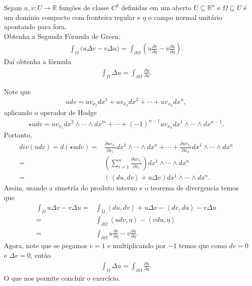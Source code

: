 \begin{homeworkProblem}[Seção 2-15]
  Sejam $u,v:U\to\mathbb{R}$ funções de classe $C^{2}$ definidas em um aberto $U\subseteq \mathbb{R}^{n}$ e $\Omega\subseteq U$ é um domínio compacto com fronteira regular e $\eta$ o campo normal unitário apontando para fora.\\
  Obtenha a Segunda Fórmula de Green:
  \begin{align*}
    \int_{\Omega}\bigl(u\Delta v-v\Delta u\bigr)=\int_{\partial\Omega}\left(u\frac{\partial v}{\partial\eta}-v\frac{\partial u}{\partial\eta}\right).
  \end{align*}
  Daí obtenha a fórmula
  \begin{align*}
    \int_{\Omega}\Delta u=\int_{\partial\Omega}\frac{\partial u}{\partial\eta}.
  \end{align*}
  \begin{solution}
    Note que
    \begin{align*}
      udv=uv_{x_1}dx^{1}+uv_{x_2}dx^{2}+\cdots+uv_{x_n}dx^{n},
    \end{align*}
    aplicando o operador de Hodge
    \begin{align*}
      \star udv=uv_{x_1}dx^{2}\wedge\cdots\wedge dx^{m}+\cdots+(-1)^{n-1}uv_{x_n}dx^{1}\wedge\cdots\wedge dx^{n-1}.
    \end{align*}
    Portanto,
    \begin{align*}
      div(udv)=d(\star udv)=&\frac{\partial uv_{x_1}}{\partial x_1}dx^{1}\wedge\cdots\wedge dx^{n}+\cdots+\frac{\partial uv_{x_n} }{\partial x_n}dx^{1}\wedge\cdots\wedge dx^{n}\\
      =&\left( \sum_{i=1}^{n}\frac{\partial uv_{x_i} }{\partial x_i} \right)dx^{1}\wedge\cdots\wedge dx^{n}\\
      =&\left( \left\langle du,dv \right\rangle+u\Delta v \right)dx^{1}\wedge\cdots\wedge dx^{n}.
    \end{align*}
    Assim, usando a simetría do produto interno e o teorema de divergencia temos que
    \begin{align*}
      \int_{\Omega}u\Delta v-v\Delta u=&\int_{\Omega}\left\langle du,dv \right\rangle+ u\Delta v-\left\langle dv,du \right\rangle-v\Delta u\\
      =&\int_{\partial \Omega}\left\langle udv,\eta \right\rangle-\left\langle vdu,\eta \right\rangle\\
      =&\int_{\partial \Omega}u\frac{\partial v}{\partial \eta}-v\frac{\partial u}{\partial \eta}.
    \end{align*}
    Agora, note que se pegamos $v=1$ e multiplicando por $-1$ temos que como $dv=0$ e $\Delta v=0$, então 
    \begin{align*}
      \int_{\Omega}\Delta u=\int_{\partial\Omega}\frac{\partial u}{\partial \eta}.
    \end{align*}
    O que nos permite concluir o exercício.
  \end{solution}
\end{homeworkProblem}
